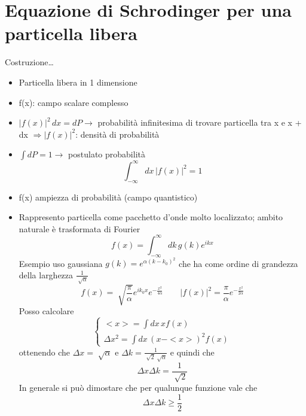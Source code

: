\section{Equazione di Schrodinger per una particella libera}
Costruzione\dots
\begin{itemize}
    \item Particella libera in 1 dimensione
    \item f(x): campo scalare complesso
    \item ${|f(x)|}^2 \, dx = dP  \rightarrow$ probabilità infinitesima di trovare particella tra x e x + dx $\Rightarrow {|f(x)|}^2$: densità di probabilità
    \item $\int dP = 1 \rightarrow$ postulato probabilità
    \begin{equation*}
        \int_{-\infty}^\infty dx \, {|f(x)|}^2 =1 
    \end{equation*}
    \item f(x) ampiezza di probabilità (campo quantistico)
    \item Rappresento particella come pacchetto d'onde molto localizzato; ambito naturale è trasformata di Fourier
    \begin{equation*}
        f(x) = \int_{-\infty}^\infty dk \, g(k)e^{ikx}
    \end{equation*}
    Esempio uso gaussiana $g(k) = e^{\alpha{(k-k_0)}^2}$ che ha come ordine di grandezza della larghezza $\frac{1}{\sqrt[]{\alpha}}$
    \begin{equation*}
        f(x) = \sqrt[]{\frac{\pi}{\alpha}}e^{ik_0x}e^{-\frac{x^2}{4\alpha}} \qquad {|f(x)|}^2 = \frac{\pi}{\alpha} e^{-\frac{x^2}{2\alpha}}
    \end{equation*}
    Posso calcolare 
    \begin{equation*}
        \begin{cases}
            <x> = \int dx \, xf(x) \\
            \Delta x^2 = \int dx \, {(x-<x>)}^2f(x)
        \end{cases}
    \end{equation*}
    ottenendo che $\Delta x= \sqrt[]{\alpha}$ e $\Delta k = \frac{1}{\sqrt[]{2}\sqrt[]{\alpha}}$ e quindi che
    \begin{equation*}
        \Delta x \Delta k = \frac{1}{\sqrt[]{2}}
    \end{equation*}
    In generale si può dimostare che per qualunque funzione vale che 
    \begin{equation*}
        \Delta x \Delta k \geq \frac{1}{2}

\end{equation*}
\end{itemize}
